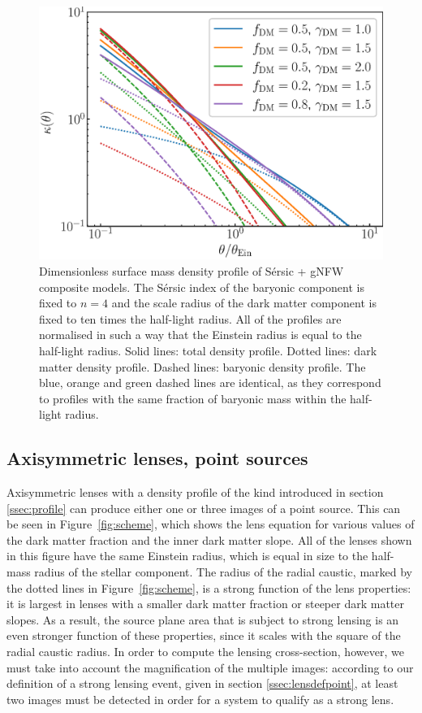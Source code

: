 \documentclass{aa}
\def\Fref#1{Figure~\ref{#1}\xspace}
\begin{document}
%
\begin{figure}
\includegraphics[width=\columnwidth]{composite_fixedap_kappa.eps}
\caption{
Dimensionless surface mass density profile of S\'{e}rsic + gNFW composite models.
The S\'{e}rsic index of the baryonic component is fixed to $n=4$ and the scale radius of the dark matter component is fixed to ten times the half-light radius.
All of the profiles are normalised in such a way that the Einstein radius is equal to the half-light radius.
Solid lines: total density profile. Dotted lines: dark matter density profile. Dashed lines: baryonic density profile.
The blue, orange and green dashed lines are identical, as they correspond to profiles with the same fraction of baryonic mass within the half-light radius.
\label{fig:kappa}
}
\end{figure}
%

\subsection{Axisymmetric lenses, point sources}\label{ssec:axsymmpoint}

Axisymmetric lenses with a density profile of the kind introduced in section \ref{ssec:profile} can produce either one or three images of a point source.
This can be seen in \Fref{fig:scheme}, which shows the lens equation for various values of the dark matter fraction and the inner dark matter slope.
All of the lenses shown in this figure have the same Einstein radius, which is equal in size to the half-mass radius of the stellar component.
The radius of the radial caustic, marked by the dotted lines in \Fref{fig:scheme}, is a strong function of the lens properties: it is largest in lenses with a smaller dark matter fraction or steeper dark matter slopes.
As a result, the source plane area that is subject to strong lensing is an even stronger function of these properties, since it scales with the square of the radial caustic radius.
In order to compute the lensing cross-section, however, we must take into account the magnification of the multiple images: according to our definition of a strong lensing event, given in section \ref{ssec:lensdefpoint}, at least two images must be detected in order for a system to qualify as a strong lens.
\end{document}
